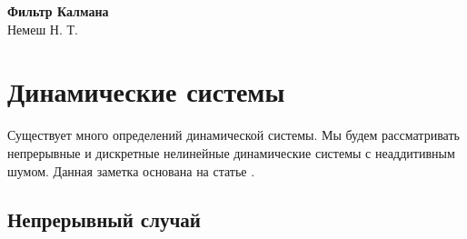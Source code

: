 \documentclass[12pt]{article}
\begin{document}
\begin{center}

    \Large \textbf{Фильтр Калмана}\\[0.5cm]
    \footnotesize {Немеш Н. Т.}\\[0.5cm]

\end{center}
\date{April 2022}

\section{Динамические системы}
\label{SectionDynamicSystems}

Существует много определений динамической системы. Мы будем рассматривать
непрерывные и дискретные нелинейные динамические системы с неаддитивным шумом. 
Данная заметка основана на статье \cite{QuatKinESKF}.

\subsection{Непрерывный случай}
\label{SubsectionContinuousCase}
\end{document}
